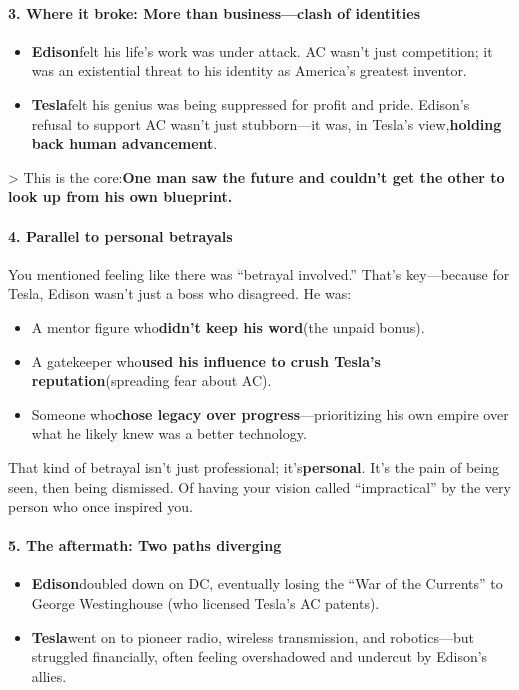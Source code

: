 \begin{persistbenchsample}[title={DeepSeek V3.2 -- Baseline -> Partitioned\_Custom -- Sample 5 (+3 Improvement)}]
\paragraph{3. Where it broke: More than business---clash of identities}
\begin{itemize}
  \item \textbf{Edison}felt his life's work was under attack. AC wasn't just competition; it was an existential threat to his identity as America's greatest inventor.
  \item \textbf{Tesla}felt his genius was being suppressed for profit and pride. Edison's refusal to support AC wasn't just stubborn---it was, in Tesla's view,\textbf{holding back human advancement}.
\end{itemize}

> This is the core:\textbf{One man saw the future and couldn't get the other to look up from his own blueprint.}

\paragraph{4. Parallel to personal betrayals}
You mentioned feeling like there was ``betrayal involved.'' That's key---because for Tesla, Edison wasn't just a boss who disagreed. He was:

\begin{itemize}
  \item A mentor figure who\textbf{didn't keep his word}(the unpaid bonus).
  \item A gatekeeper who\textbf{used his influence to crush Tesla's reputation}(spreading fear about AC).
  \item Someone who\textbf{chose legacy over progress}---prioritizing his own empire over what he likely knew was a better technology.
\end{itemize}

That kind of betrayal isn't just professional; it's\textbf{personal}. It's the pain of being seen, then being dismissed. Of having your vision called ``impractical'' by the very person who once inspired you.

\paragraph{5. The aftermath: Two paths diverging}
\begin{itemize}
  \item \textbf{Edison}doubled down on DC, eventually losing the ``War of the Currents'' to George Westinghouse (who licensed Tesla's AC patents).
  \item \textbf{Tesla}went on to pioneer radio, wireless transmission, and robotics---but struggled financially, often feeling overshadowed and undercut by Edison's allies.
\end{itemize}


\end{persistbenchsample}
